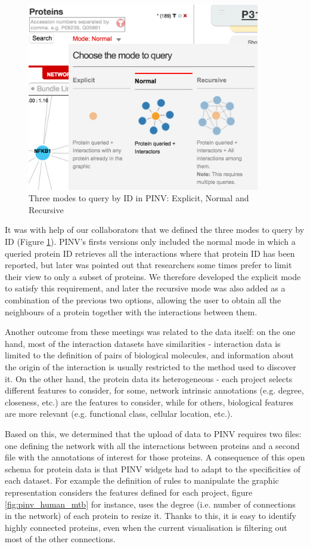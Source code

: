 \begin{figure}
\centering
\includegraphics[width=4in]{figures/pinv_modes_query.png}
\caption[Three modes to query by ID in PINV]{Three modes to query by ID in PINV: Explicit, Normal and Recursive
\label{fig:pinv_modes_query}}
\end{figure}

It was with help of our collaborators that we defined the three modes to query by ID (Figure \ref{fig:pinv_modes_query}). PINV's firsts versions only included the normal mode in which a queried protein ID retrieves all the interactions where that protein ID has been reported, but later was pointed out that researchers some times prefer to limit their view to only a subset of proteins. We therefore developed the explicit mode to satisfy this requirement, and later the recursive mode was also added as a combination of the previous two options, allowing the user to obtain all the neighbours of a protein together with the interactions between them.

Another outcome from these meetings was related to the data itself: on the one hand, most of the interaction datasets have similarities -  interaction data is  limited to the definition of pairs of biological molecules, and information about the origin of the interaction is usually restricted to the method used to discover it. On the other hand, the protein data its heterogeneous - each project selects different features to consider, for some, network intrinsic annotations (e.g. degree, closeness, etc.) are the features to consider, while for others, biological features are more relevant (e.g. functional class, cellular location, etc.). 

Based on this, we determined that the upload of data to PINV requires two files: one defining the network with all the interactions between proteins and a second file with the annotations of interest for those proteins. A consequence of this open schema for protein data is that PINV widgets had to adapt to the specificities of each dataset. For example the definition of rules to manipulate the graphic representation considers the features defined for each project, figure \ref{fig:pinv_human_mtb} for instance, uses the degree (i.e. number of connections in the network) of each protein to resize it. Thanks to this, it is easy to identify highly connected proteins, even when the current visualisation is filtering out most of the other connections.


